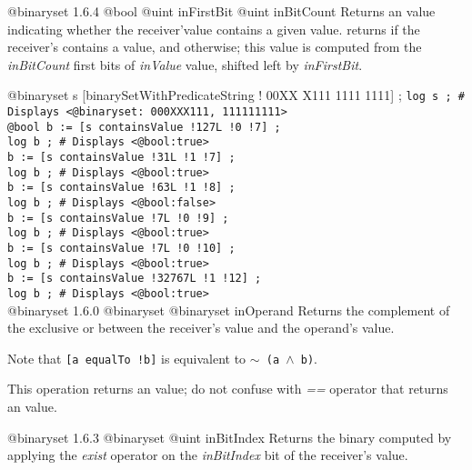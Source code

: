 {@binaryset}
{1.6.4}
{@bool}
{@uint inFirstBit}
{@uint inBitCount}
{Returns an  value indicating whether the receiver'value contains a given value.}
{returns  if the receiver's contains a value, and  otherwise; this value is computed from the \emph{inBitCount} first bits of \emph{inValue} value, shifted left by \emph{inFirstBit}.}


\exempleUneLigne
{}
{@binaryset s [binarySetWithPredicateString ! 00XX X111 1111 1111\textquotedbl] ;}
\texttt{log s ; \# Displays <@binaryset:~000XXX111, 111111111>}\\
\texttt{@bool b := [s containsValue !127L !0 !7] ;}\\
\texttt{log b ; \# Displays <@bool:true>}\\
\texttt{b := [s containsValue !31L !1 !7] ;}\\
\texttt{log b ; \# Displays <@bool:true>}\\
\texttt{b := [s containsValue !63L !1 !8] ;}\\
\texttt{log b ; \# Displays <@bool:false>}\\
\texttt{b := [s containsValue !7L !0 !9] ;}\\
\texttt{log b ; \# Displays <@bool:true>}\\
\texttt{b := [s containsValue !7L !0 !10] ;}\\
\texttt{log b ; \# Displays <@bool:true>}\\
\texttt{b := [s containsValue !32767L !1 !12] ;}\\
\texttt{log b ; \# Displays <@bool:true>}\\








{@binaryset}
{1.6.0}
{@binaryset}
{@binaryset inOperand}
{Returns the complement of the exclusive or between the receiver's value and the operand's value.}
{}

Note that \texttt{[a equalTo !b]} is equivalent to \texttt{$\sim$ (a $\wedge$ b)}.

This operation returns an  value; do not confuse with \emph{==} operator that returns an  value.







{@binaryset}
{1.6.3}
{@binaryset}
{@uint inBitIndex}
{Returns the binary computed by applying the \emph{exist} operator on the \emph{inBitIndex} bit of the receiver's value.}
{}








